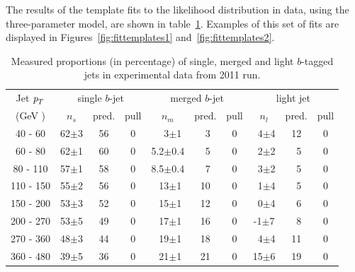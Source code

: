 The results of the template fits to the likelihood distribution in data, using the three-parameter model, are shown in table~\ref{tb:fitfractions}. Examples of this set of fits are displayed in Figures~\ref{fig:fittemplates1} and~\ref{fig:fittemplates2}.



\begin{table}[!hbt] %
\renewcommand{\arraystretch}{1.2}
\centering
\begin{tabular}{ | c || c | c | c || c | c | c || c | c | c ||}
  \hline
  Jet ${\emph{p}_{T}}$ & \multicolumn{3}{c||}{single $b$-jet} & \multicolumn{3}{c||}{merged $b$-jet} & \multicolumn{3}{c||}{~light jet~}\\ \cline{2-10}
    (GeV ) & $n_s$ & pred.& pull & $n_m$ & pred.& pull & $n_l$ & pred.& pull \\ \hline
   40 - 60 &  62$\pm$3 & 56 & 0 &  ~~3$\pm$1   & ~3 & 0 &  ~4$\pm$4  & 12 & 0\\ 
   60 - 80 &  62$\pm$1 & 60 & 0 &  5.2$\pm$0.4 & ~5 & 0 &  ~2$\pm$2  & ~5 & 0\\ 
   80 - 110&  57$\pm$1 & 58 & 0 &  8.5$\pm$0.4 & ~7 & 0 &  ~3$\pm$2  & ~5 & 0\\ 
  110 - 150&  55$\pm$2 & 56 & 0 &  ~13$\pm$1   & 10 & 0 &  ~1$\pm$4  & ~5 & 0\\ 
  150 - 200&  53$\pm$3 & 52 & 0 &  ~15$\pm$1   & 12 & 0 &  ~0$\pm$4  & ~6 & 0\\ 
  200 - 270&  53$\pm$5 & 49 & 0 &  ~17$\pm$1   & 16 & 0 &  -1$\pm$7  & ~8 & 0\\ 
  270 - 360&  48$\pm$3 & 44 & 0 &  ~19$\pm$1   & 18 & 0 &  ~4$\pm$4  & 11 & 0\\
  360 - 480&  39$\pm$5 & 36 & 0 &  ~21$\pm$1   & 21 & 0 &  15$\pm$6  & 19 & 0\\ \hline
\end{tabular}
\caption{Measured proportions (in percentage) of single, merged and light $b$-tagged jets in experimental data from 2011 run.}
\label{tb:fitfractions}
\end{table}


